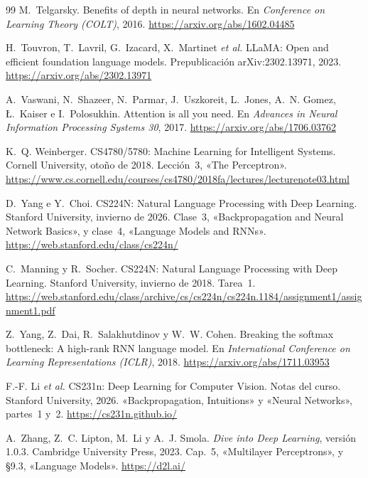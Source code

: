 \begin{thebibliography}{99}
M.~Telgarsky.
\newblock Benefits of depth in neural networks.
\newblock En \emph{Conference on Learning Theory (COLT)}, 2016.
\newblock \url{https://arxiv.org/abs/1602.04485}

H.~Touvron, T.~Lavril, G.~Izacard, X.~Martinet \emph{et al.}
\newblock LLaMA: Open and efficient foundation language models.
\newblock Prepublicación arXiv:2302.13971, 2023.
\newblock \url{https://arxiv.org/abs/2302.13971}

A.~Vaswani, N.~Shazeer, N.~Parmar, J.~Uszkoreit, L.~Jones, A.~N. Gomez, Ł.~Kaiser e I.~Polosukhin.
\newblock Attention is all you need.
\newblock En \emph{Advances in Neural Information Processing Systems 30}, 2017.
\newblock \url{https://arxiv.org/abs/1706.03762}

K.~Q. Weinberger.
\newblock CS4780/5780: Machine Learning for Intelligent Systems.
\newblock Cornell University, otoño de 2018. Lección~3, «The Perceptron».
\newblock \url{https://www.cs.cornell.edu/courses/cs4780/2018fa/lectures/lecturenote03.html}

D.~Yang e Y.~Choi.
\newblock CS224N: Natural Language Processing with Deep Learning.
\newblock Stanford University, invierno de 2026. Clase~3, «Backpropagation and Neural Network Basics», y clase~4, «Language Models and RNNs».
\newblock \url{https://web.stanford.edu/class/cs224n/}

C.~Manning y R.~Socher.
\newblock CS224N: Natural Language Processing with Deep Learning.
\newblock Stanford University, invierno de 2018. Tarea~1.
\newblock \url{https://web.stanford.edu/class/archive/cs/cs224n/cs224n.1184/assignment1/assignment1.pdf}

Z.~Yang, Z.~Dai, R.~Salakhutdinov y W.~W. Cohen.
\newblock Breaking the softmax bottleneck: A high-rank RNN language model.
\newblock En \emph{International Conference on Learning Representations (ICLR)}, 2018.
\newblock \url{https://arxiv.org/abs/1711.03953}

F.-F. Li \emph{et al.}
\newblock CS231n: Deep Learning for Computer Vision. Notas del curso.
\newblock Stanford University, 2026. «Backpropagation, Intuitions» y «Neural Networks», partes~1 y~2.
\newblock \url{https://cs231n.github.io/}

A.~Zhang, Z.~C. Lipton, M.~Li y A.~J. Smola.
\newblock \emph{Dive into Deep Learning}, versión 1.0.3.
\newblock Cambridge University Press, 2023.
\newblock Cap.~5, «Multilayer Perceptrons», y §9.3, «Language Models».
\newblock \url{https://d2l.ai/}

\end{thebibliography}
